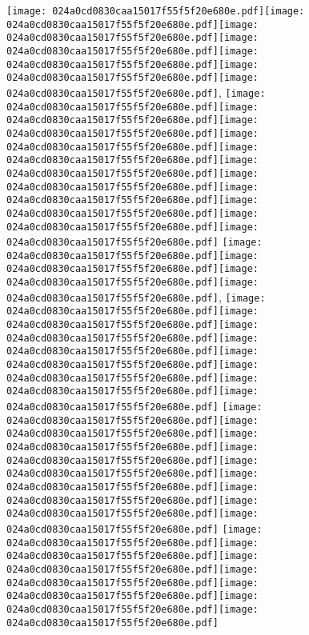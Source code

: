 \documentclass{article}
\newcommand{\origpg}[2]{\texttt{[image: 024a0cd0830caa15017f55f5f20e680e.pdf]}}
\begin{document}
{\vspace{8.576pt}\hspace{35.438pt}\origpg9{120.74pt 645.32pt 133.49pt 661.46pt}\origpg9{133.49pt 645.32pt 141.56pt 661.46pt}\hspace{-0.339pt}\origpg9{141.22pt 645.32pt 149.86pt 661.46pt}\origpg9{149.86pt 645.32pt 157.7pt 661.46pt}\hspace{0.129pt}\origpg9{157.83pt 645.32pt 166.47pt 661.46pt}\origpg9{166.47pt 645.32pt 175.1pt 661.46pt}\origpg9{175.17pt 645.32pt 183.8pt 661.46pt}, \origpg9{191.77pt 645.32pt 199.84pt 661.46pt}\hspace{-0.113pt}\origpg9{199.73pt 645.32pt 206.9pt 661.46pt}\origpg9{206.95pt 645.32pt 213.32pt 661.46pt}\hspace{-0.113pt}\origpg9{213.21pt 645.32pt 221.28pt 661.46pt}\hspace{-0.113pt}\origpg9{221.17pt 645.32pt 229.38pt 661.46pt}\origpg9{229.38pt 645.32pt 237.45pt 661.46pt}\hspace{-0.145pt}\origpg9{237.31pt 645.32pt 244.47pt 661.46pt}\origpg9{244.52pt 645.32pt 253.16pt 661.46pt}\origpg9{253.16pt 645.32pt 261.79pt 661.46pt}\origpg9{261.86pt 645.32pt 272.7pt 661.46pt}\origpg9{272.7pt 645.32pt 279.87pt 661.46pt} \origpg9{283.53pt 645.32pt 291.15pt 661.46pt}\origpg9{291.23pt 645.32pt 302.08pt 661.46pt}\hspace{-0.242pt}\origpg9{301.84pt 645.32pt 314.26pt 661.46pt}\origpg9{314.34pt 645.32pt 321.51pt 661.46pt}\hspace{-0.178pt}, \origpg9{329.5pt 645.32pt 336.92pt 661.46pt}\origpg9{336.92pt 645.32pt 344.54pt 661.46pt}\hspace{-0.113pt}\origpg9{344.43pt 645.32pt 352.48pt 661.46pt}\hspace{-0.339pt}\origpg9{352.14pt 645.32pt 359.57pt 661.46pt}\hspace{-0.194pt}\origpg9{359.38pt 645.32pt 371.43pt 661.46pt}\hspace{-0.258pt}\origpg9{371.17pt 645.32pt 378.23pt 661.46pt}\hspace{0.161pt}\origpg9{378.39pt 645.32pt 385.55pt 661.46pt}\origpg9{385.6pt 645.32pt 393.03pt 661.46pt} \origpg9{397.14pt 645.32pt 405.21pt 661.46pt}\hspace{0.361pt}\origpg9{405.58pt 645.32pt 412.74pt 661.46pt}\origpg9{412.79pt 645.32pt 421.43pt 661.46pt}\origpg9{421.42pt 645.32pt 429.5pt 661.46pt}\origpg9{429.41pt 645.32pt 437.03pt 661.46pt}\hspace{-0.145pt}\origpg9{436.89pt 645.32pt 445.52pt 661.46pt}\origpg9{445.52pt 645.32pt 456.37pt 661.46pt}\origpg9{456.37pt 645.32pt 466.59pt 661.46pt}\origpg9{466.52pt 645.32pt 475.16pt 661.46pt} \origpg9{479.27pt 645.32pt 487.49pt 661.46pt}\hspace{-0.5pt}\origpg9{486.99pt 645.32pt 495.04pt 661.46pt}\origpg9{494.94pt 645.32pt 503.01pt 661.46pt}\hspace{-0.113pt}\origpg9{502.9pt 645.32pt 510.75pt 661.46pt}\hspace{-0.129pt}\origpg9{510.62pt 645.32pt 517.78pt 661.46pt}\origpg9{517.83pt 645.32pt 528.05pt 661.46pt}\hspace{-0.339pt}\origpg9{527.71pt 645.32pt 536.34pt 661.46pt} 

}
\end{document}
